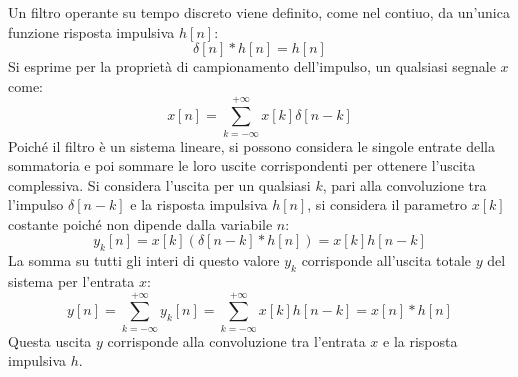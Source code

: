 \documentclass{article}
\numberwithin{equation}{subsection}
\begin{document}
Un filtro operante su tempo discreto viene definito, come nel contiuo, da un'unica funzione risposta impulsiva $h[n]$:
\begin{equation*}
    \delta[n]*h[n]=h[n]
\end{equation*}
Si esprime per la proprietà di campionamento dell'impulso, un qualsiasi segnale $x$ come:
\begin{equation*}
    x[n]=\displaystyle\sum_{k=-\infty}^{+\infty}x[k]\delta[n-k]
\end{equation*}
Poiché il filtro è un sistema lineare, si possono considera le singole entrate della sommatoria e poi sommare le loro uscite corrispondenti per ottenere l'uscita complessiva. 
Si considera l'uscita per un qualsiasi $k$, pari alla convoluzione tra l'impulso $\delta[n-k]$ e la risposta impulsiva $h[n]$, si considera il parametro $x[k]$ costante poiché 
non dipende dalla variabile $n$:
\begin{equation*}
    y_k[n]=x[k](\delta[n-k]*h[n])=x[k]h[n-k]
\end{equation*}
La somma su tutti gli interi di questo valore $y_k$ corrisponde all'uscita totale $y$ del sistema per l'entrata $x$:
\begin{equation*}
    y[n]=\displaystyle\sum_{k=-\infty}^{+\infty}y_k[n]=\sum_{k=-\infty}^{+\infty}x[k]h[n-k]=x[n]*h[n]
\end{equation*}
Questa uscita $y$ corrisponde alla convoluzione tra l'entrata $x$ e la risposta impulsiva $h$. 
\end{document}
